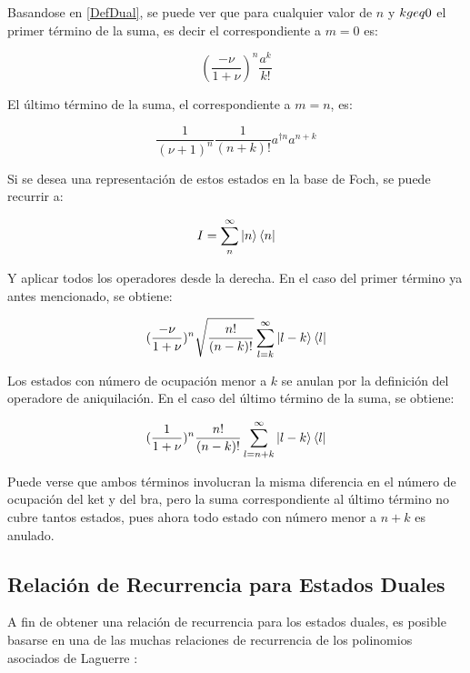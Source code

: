 \documentclass[a4paper,10pt]{report}
\begin{document}
Basandose en \ref{DefDual}, se puede ver que para cualquier valor de $n$ y $k \\geq 0$ el primer término de la suma, es decir el correspondiente a $m=0$ es:

\begin{equation}
(\frac{-\nu}{1+\nu})^n \frac{a^k}{k!}
\end{equation} 

El último término de la suma, el correspondiente a $m=n$, es:

\begin{equation}
\frac{1}{(\nu+1)^n} \frac{1}{(n+k)!} a^{\dagger n}a^{n+k}
\end{equation}

Si se desea una representación de estos estados en la base de Foch, se puede recurrir a:

\begin{equation}
I = \sum^\infty _n \Ket{n}\Bra{n}
\end{equation}

Y aplicar todos los operadores desde la derecha. En el caso del primer término ya antes mencionado, se obtiene:

\begin{equation}
 (\frac{-\nu}{1+\nu})^n \sqrt{\frac{n!}{(n-k)!}}\sum^\infty _{l=k} \Ket{l-k}\Bra{l}
\end{equation}

Los estados con número de ocupación menor a $k$ se anulan por la definición del operadore de aniquilación. En el caso del último término de la suma, se obtiene:

\begin{equation}
(\frac{1}{1+\nu})^n \frac{n!}{(n-k)!}\sum^\infty _{l=n+k} \Ket{l-k}\Bra{l}
\end{equation}

Puede verse que ambos términos involucran la misma diferencia en el número de ocupación del ket y del bra, pero la suma correspondiente al último término no cubre tantos estados, pues ahora todo estado con número menor a $n+k$ es anulado.

\subsection{Relación de Recurrencia para Estados Duales}

A fin de obtener una relación de recurrencia para los estados duales, es posible basarse en una de las muchas relaciones de recurrencia de los polinomios asociados de Laguerre \cite{ArfkenMM}:
\end{document}
